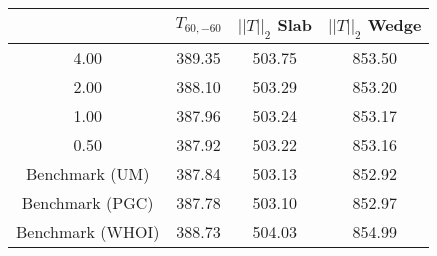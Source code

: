 \begin{tabular}{c|ccc}
    & $T_{60,-60}$ & $||T||_2$ Slab & $||T||_2$ Wedge \\
\hline
4.00 & 389.35 & 503.75 & 853.50 \\
2.00 & 388.10 & 503.29 & 853.20 \\
1.00 & 387.96 & 503.24 & 853.17 \\
0.50 & 387.92 & 503.22 & 853.16 \\
\hline
Benchmark (UM) & 387.84 & 503.13 & 852.92 \\
Benchmark (PGC) & 387.78 & 503.10 & 852.97 \\
Benchmark (WHOI) & 388.73 & 504.03 & 854.99 \\
\end{tabular}
